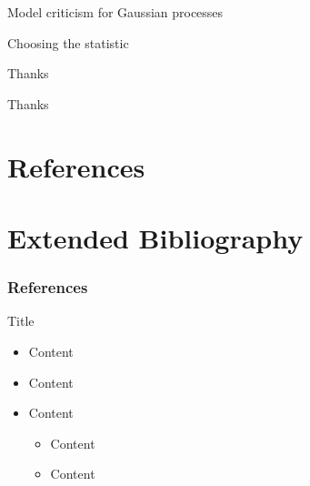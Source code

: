 \begin{frame}{Model criticism for Gaussian processes}
\end{frame}

\begin{frame}{Choosing the statistic}
\end{frame}

\begin{frame}{Thanks}
  \begin{center}
  \Huge
  Thanks
  \end{center}
\end{frame}

{
\section{References}
\section{Extended Bibliography}
\tiny
\begin{frame}
  \frametitle{References}
  
  
\end{frame}
}



\begin{frame}{Title}
  \begin{itemize}
    \item Content
    \vspace{\baselineskip}
    \item Content
    \vspace{\baselineskip}
    \item Content
    \begin{itemize}
       \item Content
       \item Content
     \end{itemize}
  \end{itemize}
\end{frame}
